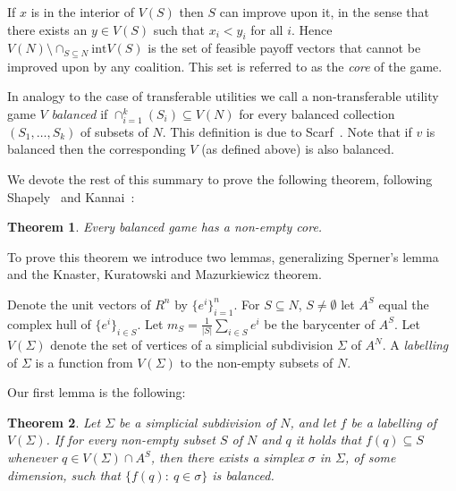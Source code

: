 \documentclass[11pt]{article} \usepackage{amssymb}
\newtheorem{theorem}{Theorem}[section]
\begin{document}
If $x$ is in the interior of $V(S)$ then $S$ can improve upon it, in
the sense that there exists an $y \in V(S)$ such that $x_i < y_i$ for
all $i$. Hence $V(N) \setminus \cap_{S \subseteq N} \mbox{int} V(S)$ is the
set of feasible payoff vectors that cannot be improved upon by any
coalition. This set is referred to as the {\em core} of the game.

In analogy to the case of transferable utilities we call a
non-transferable utility game $V$ {\em balanced} if $\cap_{i=1}^k(S_i)
\subseteq V(N)$ for every balanced collection $(S_1,\ldots,S_k)$ of
subsets of $N$. This definition is due to
Scarf~\cite{scarf:1967}. Note that if $v$ is balanced then the
corresponding $V$ (as defined above) is also balanced.

We devote the rest of this summary to prove the following theorem,
following Shapely~\cite{shapley:1973} and Kannai~\cite{kannai:1970}:

\begin{theorem}
  \label{thm:0}
  Every balanced game has a non-empty core.
\end{theorem}

To prove this theorem we introduce two lemmas, generalizing Sperner's
lemma and the Knaster, Kuratowski and Mazurkiewicz theorem.

Denote the unit vectors of $R^n$ by $\{e^i\}_{i=1}^n$. For $S
\subseteq N$, $S \neq \emptyset$ let $A^S$ equal the complex hull of
$\{e^i\}_{i \in S}$. Let $m_S = \frac{1}{|S|}\sum_{i \in S}e^i$ be the
barycenter of $A^S$. Let $V(\Sigma)$ denote the set of vertices of a
simplicial subdivision $\Sigma$ of $A^N$. A {\em labelling} of
$\Sigma$ is a function from $V(\Sigma)$ to the non-empty subsets of
$N$.

Our first lemma is the following:
\begin{theorem}
  \label{thm:sperner}
  Let $\Sigma$ be a simplicial subdivision of $N$, and let $f$ be a
  labelling of $V(\Sigma)$. If for every non-empty subset $S$ of $N$
  and $q$ it holds that $f(q) \subseteq S$ whenever $q \in V(\Sigma)
  \cap A^S$, then there exists a simplex $\sigma$ in $\Sigma$, of some
  dimension, such that $\{f(q):\: q \in \sigma\}$ is {\em balanced}.
\end{theorem}
\end{document}
